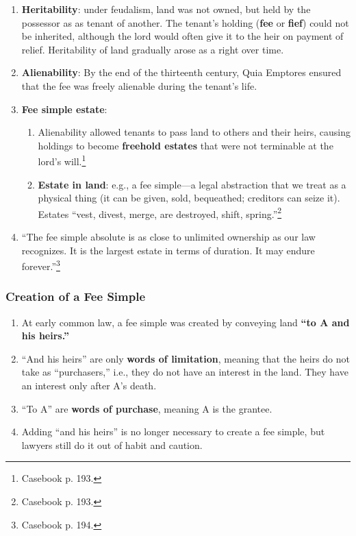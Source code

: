 \begin{enumerate}
    \item \textbf{Heritability}: under feudalism, land was not owned, but held 
    by the possessor as as tenant of another. The tenant's holding 
    (\textbf{fee} or \textbf{fief}) could not be inherited, although the lord 
    would often give it to the heir on payment of relief. Heritability of land 
    gradually arose as a right over time.
    \item \textbf{Alienability}: By the end of the thirteenth century, Quia Emptores 
    ensured that the fee was freely alienable during the tenant's life.
    \item \textbf{Fee simple estate}:
    \begin{enumerate}
        \item Alienability allowed tenants to pass land to others and their 
        heirs, causing holdings to become \textbf{freehold estates} that were 
        not terminable at the lord's will.\footnote{Casebook p. 193.}
        \item \textbf{Estate in land}: e.g., a fee simple---a legal 
        abstraction that we treat as a physical thing (it can be given, sold, 
        bequeathed; creditors can seize it). Estates ``vest, divest, merge, 
        are destroyed, shift, spring.''\footnote{Casebook p. 193.}
    \end{enumerate}
    \item ``The fee simple absolute is as close to unlimited ownership as our 
    law recognizes. It is the largest estate in terms of duration. It may 
    endure forever.''\footnote{Casebook p. 194.}
\end{enumerate}

\subsubsection{Creation of a Fee Simple}

\begin{enumerate}
    \item At early common law, a fee simple was created by conveying land 
    \textbf{``to A and his heirs.''}
    \item ``And his heirs'' are only \textbf{words of limitation}, meaning 
    that the heirs do not take as ``purchasers,'' i.e., they do not have an 
    interest in the land. They have an interest only after A's death.
    \item ``To A'' are \textbf{words of purchase}, meaning A is the grantee.
    \item Adding ``and his heirs'' is no longer necessary to create a fee 
    simple, but lawyers still do it out of habit and caution.
\end{enumerate}


